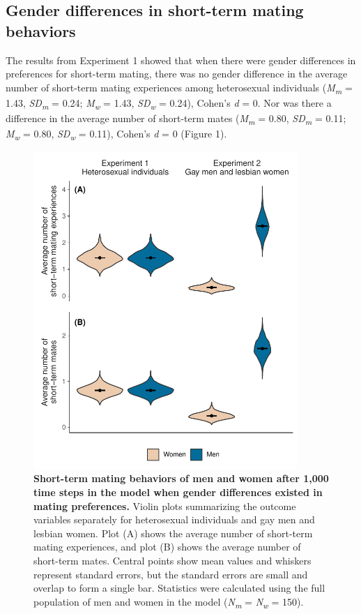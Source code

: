\documentclass[
  11pt,
]{article}
\begin{document}
\hypertarget{gender-differences-in-short-term-mating-behaviors}{%
\subsection{Gender differences in short-term mating
behaviors}\label{gender-differences-in-short-term-mating-behaviors}}

The results from Experiment 1 showed that when there were gender
differences in preferences for short-term mating, there was no gender
difference in the average number of short-term mating experiences among
heterosexual individuals (\emph{M\textsubscript{m}} = 1.43,
\emph{SD\textsubscript{m}} = 0.24; \emph{M\textsubscript{w}} = 1.43,
\emph{SD\textsubscript{w}} = 0.24), Cohen's \emph{d} = 0. Nor was there
a difference in the average number of short-term mates
(\emph{M\textsubscript{m}} = 0.80, \emph{SD\textsubscript{m}} = 0.11;
\emph{M\textsubscript{w}} = 0.80, \emph{SD\textsubscript{w}} = 0.11),
Cohen's \emph{d} = 0 (Figure 1).

\begin{figure}[h]
  \centering
  \includegraphics[width=100mm]{figures/fig1_men_vs_women.pdf}
  \caption{\textbf{Short-term mating behaviors of men and women after 1,000 time steps in the model when gender differences existed in mating preferences.} Violin plots summarizing the outcome variables separately for heterosexual individuals and gay men and lesbian women. Plot (A) shows the average number of short-term mating experiences, and plot (B) shows the average number of short-term mates. Central points show mean values and whiskers represent standard errors, but the standard errors are small and overlap to form a single bar. Statistics were calculated using the full population of men and women in the model (\textit{N\textsubscript{m}} = \textit{N\textsubscript{w}} = 150).}
\end{figure}
\end{document}
